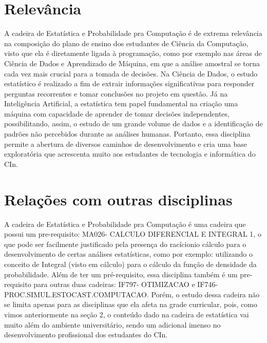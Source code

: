 \documentclass{article}
\begin{document}
\section{Relevância}
\par
A cadeira de Estatística e Probabilidade pra Computação é de extrema relevância na composição do plano de ensino dos estudantes de Ciência da Computação, visto que ela é diretamente ligada à programação, como por exemplo nas áreas de Ciência de Dados e Aprendizado de Máquina, em que a análise amostral se torna cada vez mais crucial para a tomada de decisões. Na Ciência de Dados, o estudo estatístico é realizado a fim de extrair informações significativas para responder perguntas recorrentes e tomar conclusões no projeto em questão. Já na Inteligência Artificial, a estatística tem papel fundamental na criação uma máquina com capacidade de aprender de tomar decisões independentes, possibilitando, assim, o estudo de um grande volume de dados e a identificação de padrões não percebidos durante as análises humanas. Portanto, essa disciplina permite a abertura de diversos caminhos de desenvolvimento e cria uma base exploratória que acrescenta muito aos estudantes de tecnologia e informática do CIn.
\cite{livro_base}
\cite{livro_suplementar}

\section{Relações com outras disciplinas}
\par
A cadeira de Estatística e Probabilidade pra Computação é uma cadeira que possui um pre-requisito: MA026- CALCULO DIFERENCIAL E INTEGRAL 1, o que pode ser facilmente justificado pela presença do racícionio cálculo para o desenvolvimento de certas análises estatísticas, como por exemplo: utilizando o conceito de Integral (visto em cálculo) para o cálculo da função de densidade da probabilidade. Além de ter um pré-requisito, essa disciplina também é um pre-requisito para outras duas cadeiras: IF797- OTIMIZACAO e IF746- PROC.SIMUL.ESTOCAST.COMPUTACAO. Porém, o estudo dessa cadeira não se limita apenas para as disciplinas que ela afeta na grade curricular, pois, como vimos anteriormente na seção 2, o conteúdo dado na cadeira de estatística vai muito além do ambiente universitário, sendo um adicional imenso no desenvolvimento profissional dos estudantes do CIn.
\cite{site_curso}




\end{document}

